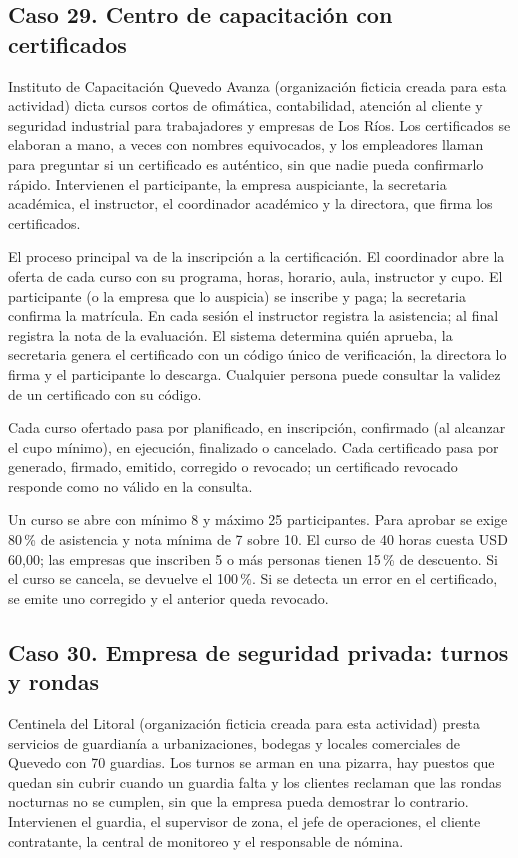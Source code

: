 \documentclass[11pt]{article}
\newcommand{\subseccion}[1]{\subsection{\textcolor{midblue}{#1}}}
\begin{document}
\subseccion{Caso 29. Centro de capacitación con certificados}
Instituto de Capacitación Quevedo Avanza (organización ficticia creada para esta actividad) dicta cursos cortos de ofimática, contabilidad, atención al cliente y seguridad industrial para trabajadores y empresas de Los Ríos. Los certificados se elaboran a mano, a veces con nombres equivocados, y los empleadores llaman para preguntar si un certificado es auténtico, sin que nadie pueda confirmarlo rápido. Intervienen el participante, la empresa auspiciante, la secretaria académica, el instructor, el coordinador académico y la directora, que firma los certificados.

El proceso principal va de la inscripción a la certificación. El coordinador abre la oferta de cada curso con su programa, horas, horario, aula, instructor y cupo. El participante (o la empresa que lo auspicia) se inscribe y paga; la secretaria confirma la matrícula. En cada sesión el instructor registra la asistencia; al final registra la nota de la evaluación. El sistema determina quién aprueba, la secretaria genera el certificado con un código único de verificación, la directora lo firma y el participante lo descarga. Cualquier persona puede consultar la validez de un certificado con su código.

Cada curso ofertado pasa por planificado, en inscripción, confirmado (al alcanzar el cupo mínimo), en ejecución, finalizado o cancelado. Cada certificado pasa por generado, firmado, emitido, corregido o revocado; un certificado revocado responde como no válido en la consulta.

Un curso se abre con mínimo 8 y máximo 25 participantes. Para aprobar se exige 80\,\% de asistencia y nota mínima de 7 sobre 10. El curso de 40 horas cuesta USD 60,00; las empresas que inscriben 5 o más personas tienen 15\,\% de descuento. Si el curso se cancela, se devuelve el 100\,\%. Si se detecta un error en el certificado, se emite uno corregido y el anterior queda revocado.

\subseccion{Caso 30. Empresa de seguridad privada: turnos y rondas}
Centinela del Litoral (organización ficticia creada para esta actividad) presta servicios de guardianía a urbanizaciones, bodegas y locales comerciales de Quevedo con 70 guardias. Los turnos se arman en una pizarra, hay puestos que quedan sin cubrir cuando un guardia falta y los clientes reclaman que las rondas nocturnas no se cumplen, sin que la empresa pueda demostrar lo contrario. Intervienen el guardia, el supervisor de zona, el jefe de operaciones, el cliente contratante, la central de monitoreo y el responsable de nómina.
\end{document}
